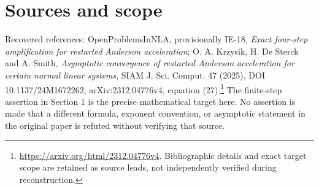 \documentclass[11pt]{article}
\begin{document}
\section{Sources and scope}
Recovered references: OpenProblemsInNLA, provisionally IE-18, \emph{Exact four-step amplification for restarted Anderson acceleration}; O. A. Krzysik, H. De Sterck and A. Smith, \emph{Asymptotic convergence of restarted Anderson acceleration for certain normal linear systems}, SIAM J. Sci. Comput. 47 (2025), DOI 10.1137/24M1672262, arXiv:2312.04776v4, equation (27).\footnote{\url{https://arxiv.org/html/2312.04776v4}. Bibliographic details and exact target scope are retained as source leads, not independently verified during reconstruction.}
The finite-step assertion in Section 1 is the precise mathematical target here. No assertion is made that a different formula, exponent convention, or asymptotic statement in the original paper is refuted without verifying that source.
\end{document}
